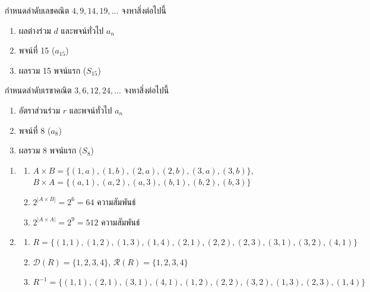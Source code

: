 \begin{exercise}
กำหนดลำดับเลขคณิต $4, 9, 14, 19, \dots$ จงหาสิ่งต่อไปนี้
\begin{enumerate}
    \item ผลต่างร่วม $d$ และพจน์ทั่วไป $a_n$
    \item พจน์ที่ 15 ($a_{15}$)
    \item ผลรวม 15 พจน์แรก ($S_{15}$)
\end{enumerate}
\end{exercise}

\begin{exercise}
กำหนดลำดับเรขาคณิต $3, 6, 12, 24, \dots$ จงหาสิ่งต่อไปนี้
\begin{enumerate}
    \item อัตราส่วนร่วม $r$ และพจน์ทั่วไป $a_n$
    \item พจน์ที่ 8 ($a_8$)
    \item ผลรวม 8 พจน์แรก ($S_8$)
\end{enumerate}
\end{exercise}

\answerkeyhead
{}
\begin{enumerate}[series=anskey,label={},leftmargin=0pt,itemsep=0.6em]
    \item
    \begin{enumerate}[label=\textbf{\thechapter.\arabic{enumi}.\arabic*}]
        \item $A \times B = \{(1,a),(1,b),(2,a),(2,b),(3,a),(3,b)\}$, $B \times A = \{(a,1),(a,2),(a,3),(b,1),(b,2),(b,3)\}$
        \item $2^{|A \times B|} = 2^6 = 64$ ความสัมพันธ์
        \item $2^{|A \times A|} = 2^9 = 512$ ความสัมพันธ์
    \end{enumerate}

    \item
    \begin{enumerate}[label=\textbf{\thechapter.\arabic{enumi}.\arabic*}]
        \item $R = \{(1,1),(1,2),(1,3),(1,4),(2,1),(2,2),(2,3),(3,1),(3,2),(4,1)\}$
        \item $\mathcal{D}(R) = \{1,2,3,4\}$, $\mathcal{R}(R) = \{1,2,3,4\}$
        \item $R^{-1} = \{(1,1),(2,1),(3,1),(4,1),(1,2),(2,2),(3,2),(1,3),(2,3),(1,4)\}$
    \end{enumerate}
\end{enumerate}

